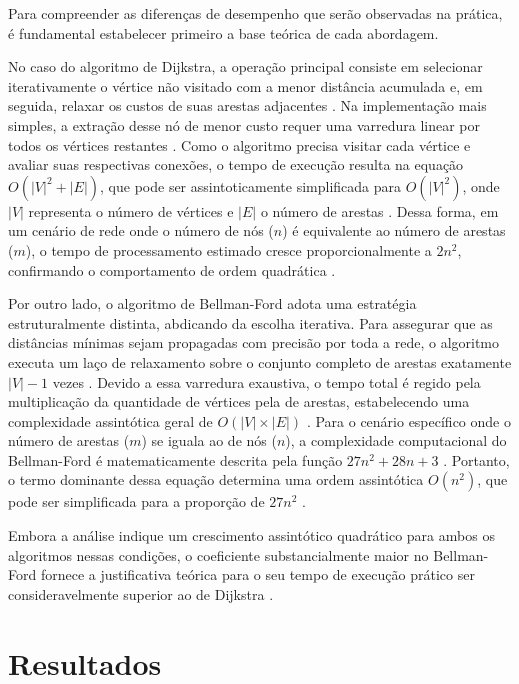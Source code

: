 \documentclass[12pt]{article}
\begin{document}
Para compreender as diferenças de desempenho que serão observadas na
prática, é fundamental estabelecer primeiro a base teórica de cada abordagem.

No caso do algoritmo de Dijkstra, a operação principal consiste em selecionar
iterativamente o vértice não visitado com a menor distância acumulada e, em
seguida, relaxar os custos de suas arestas adjacentes \cite{thippeswamy}.
Na implementação mais simples, a extração desse nó de menor custo requer uma
varredura linear por todos os vértices restantes \cite{thippeswamy}. Como o
algoritmo precisa visitar cada vértice e avaliar suas respectivas conexões, o
tempo de execução resulta na equação $O(|V|^2 + |E|)$, que pode ser
assintoticamente simplificada para $O(|V|^2)$, onde $|V|$ representa o número
de vértices e $|E|$ o número de arestas \cite{thippeswamy}. Dessa forma, em um
cenário de rede onde o número de nós ($n$) é equivalente ao número
de arestas ($m$), o tempo de processamento estimado cresce proporcionalmente
a $2n^2$, confirmando o comportamento de ordem quadrática \cite{thippeswamy}.

Por outro lado, o algoritmo de Bellman-Ford adota uma estratégia estruturalmente
distinta, abdicando da escolha iterativa. Para assegurar que as distâncias
mínimas sejam propagadas com precisão por toda a rede, o algoritmo
executa um laço
de relaxamento sobre o conjunto completo de arestas exatamente $|V|-1$
vezes \cite{thippeswamy}. Devido a essa varredura exaustiva, o tempo
total é regido
pela multiplicação da quantidade de vértices pela de arestas, estabelecendo uma
complexidade assintótica geral de $O(|V| \times |E|)$ \cite{thippeswamy}. Para o
cenário específico onde o número de arestas ($m$) se iguala ao de nós ($n$), a
complexidade computacional do Bellman-Ford é matematicamente descrita
pela função
$27n^2 + 28n + 3$ \cite{thippeswamy}. Portanto, o termo dominante dessa equação
determina uma ordem assintótica $O(n^2)$, que pode ser simplificada
para a proporção
de $27n^2$ \cite{thippeswamy}.

Embora a análise indique um crescimento assintótico quadrático para
ambos os algoritmos
nessas condições, o coeficiente substancialmente maior no Bellman-Ford fornece a
justificativa teórica para o seu tempo de execução prático ser
consideravelmente superior
ao de Dijkstra \cite{thippeswamy}.

\section{Resultados} \label{sec:resultados}
\end{document}
